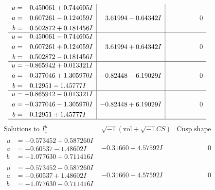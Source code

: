 \documentclass[1p]{elsarticle_modified}
\theoremstyle{definition}
\newcommand{\I}{\sqrt{-1}}
\begin{document}
$$\begin{array}{c|c|c}
\begin{aligned}
u &= \phantom{-}0.450061 + 0.744605 I \\
a &= \phantom{-}0.607261 - 0.124059 I \\
b &= \phantom{-}0.502872 + 0.181456 I\end{aligned}
 & \phantom{-}3.61994 - 0.64342 I & \phantom{-0.000000 } 0 \\ \hline\begin{aligned}
u &= \phantom{-}0.450061 - 0.744605 I \\
a &= \phantom{-}0.607261 + 0.124059 I \\
b &= \phantom{-}0.502872 - 0.181456 I\end{aligned}
 & \phantom{-}3.61994 + 0.64342 I & \phantom{-0.000000 } 0 \\ \hline\begin{aligned}
u &= -0.865942 + 0.013321 I \\
a &= -0.377046 + 1.305970 I \\
b &= \phantom{-}0.12951 - 1.45777 I\end{aligned}
 & -0.82448 - 6.19029 I & \phantom{-0.000000 } 0 \\ \hline\begin{aligned}
u &= -0.865942 - 0.013321 I \\
a &= -0.377046 - 1.305970 I \\
b &= \phantom{-}0.12951 + 1.45777 I\end{aligned}
 & -0.82448 + 6.19029 I & \phantom{-0.000000 } 0\\
 \hline 
 \end{array}$$\newpage$$\begin{array}{c|c|c}  
\text{Solutions to }I^u_{1}& \I (\text{vol} + \sqrt{-1}CS) & \text{Cusp shape}\\
 \hline 
\begin{aligned}
u &= -0.573452 + 0.587260 I \\
a &= -0.60537 - 1.48602 I \\
b &= -1.077630 + 0.711416 I\end{aligned}
 & -0.31660 + 4.57592 I & \phantom{-0.000000 } 0 \\ \hline\begin{aligned}
u &= -0.573452 - 0.587260 I \\
a &= -0.60537 + 1.48602 I \\
b &= -1.077630 - 0.711416 I\end{aligned}
 & -0.31660 - 4.57592 I & \phantom{-0.000000 } 0 \\ \hline\begin{aligned}

\end{aligned}
\end{array}$$
\end{document}
